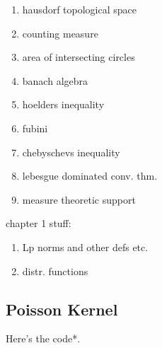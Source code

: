 \begin{enumerate}
\item hausdorf topological space
\item counting measure
\item area of intersecting circles
\item banach algebra
\item hoelders inequality
\item fubini
\item chebyschevs inequality
\item lebesgue dominated conv. thm.
\item measure theoretic support
\end{enumerate}

chapter 1 stuff:
\begin{enumerate}
\item Lp norms and other defs etc.
\item distr. functions
\end{enumerate}

\begin{appendix}
\section{Poisson Kernel}
Here's the code*.
\end{appendix}

